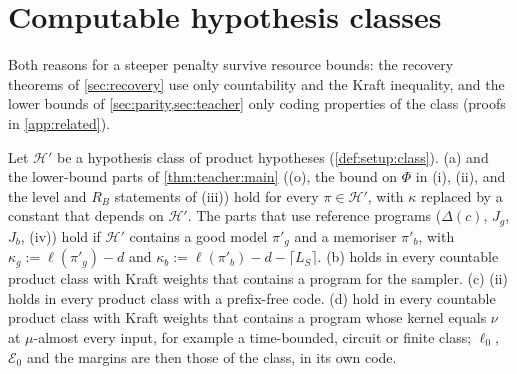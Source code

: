 \section{Computable hypothesis classes}\label{sec:computable}\label{sec:related:computable}

Both reasons for a steeper penalty survive resource bounds: the recovery theorems of \cref{sec:recovery} use only countability and the Kraft inequality, and the lower bounds of \cref{sec:parity,sec:teacher} only coding properties of the class (proofs in \cref{app:related}).

\begin{proposition}\label{prop:related:computable}
Let $\mathcal H'$ be a hypothesis class of product hypotheses (\cref{def:setup:class}).
(a)  and the lower-bound parts of \cref{thm:teacher:main} ((o), the bound on $\Phi$ in (i), (ii), and the level and $R_B$ statements of (iii)) hold for every $\pi\in\mathcal H'$, with $\kappa$ replaced by a constant that depends on $\mathcal H'$. The parts that use reference programs ($\Delta(c)$, $J_g$, $J_b$, (iv)) hold if $\mathcal H'$ contains a good model $\pi'_g$ and a memoriser $\pi'_b$, with $\kappa_g:=\ell(\pi'_g)-d$ and $\kappa_b:=\ell(\pi'_b)-d-\lceil L_S\rceil$.
(b)  holds in every countable product class with Kraft weights that contains a program for the sampler.
(c) (ii) holds in every product class with a prefix-free code.
(d)  hold in every countable product class with Kraft weights that contains a program whose kernel equals $\nu$ at $\mu$-almost every input, for example a time-bounded, circuit or finite class; $\ell_0$, $\mathcal E_0$ and the margins are then those of the class, in its own code.
\end{proposition}

